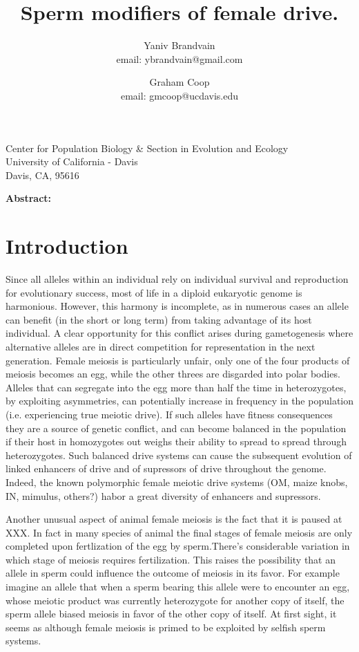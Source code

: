 \documentclass[12pt,letterpaper]{article}
\title{Sperm modifiers of female drive.}
\author{Yaniv Brandvain \\ email: ybrandvain@gmail.com  \and Graham Coop \\ email: gmcoop@ucdavis.edu }
\date{}
\begin{document}
\maketitle
\begin{center}
Center for Population Biology \& Section in Evolution and Ecology \\ University of California - Davis \\ Davis, CA, 95616
\end{center}

{\bf Abstract:}
\newpage

\section*{Introduction}

Since all alleles within an individual rely on individual survival and reproduction for evolutionary success, most of life in a diploid eukaryotic genome is harmonious.
However, this harmony is incomplete, as in numerous cases an allele can benefit (in the short or long term) from taking advantage of its host individual.
A clear opportunity for this conflict arises during gametogenesis where alternative alleles are in direct competition for representation in the next generation.
Female meiosis is particularly unfair, only one of the four products of meiosis becomes an egg, while the other threes
are disgarded into polar bodies. 
Alleles that can segregate into the egg more than half the time in heterozygotes, by exploiting asymmetries, 
can potentially increase in frequency in the population (i.e. experiencing true meiotic drive).
If such alleles have fitness consequences they are a source of genetic conflict, 
and can become balanced in the population if their host in homozygotes 
out weighs their ability to spread to spread through heterozygotes. 
Such balanced drive systems can cause the subsequent evolution of linked enhancers of drive
and of supressors of drive throughout the genome. 
Indeed, the known polymorphic female meiotic drive systems (OM, maize knobs, IN, mimulus, others?) habor
a great diversity of enhancers and supressors. 

Another unusual aspect of animal female meiosis is the fact that it is paused at XXX.
In fact in many species of animal the final stages of female meiosis are only completed upon fertlization of the egg by sperm.There's considerable variation in 
which stage of meiosis requires fertilization.
This raises the possibility that an allele in sperm could influence the outcome of meiosis in its favor. 
For example imagine an allele that when a sperm bearing this allele were to encounter an egg, whose meiotic product was currently heterozygote for 
another copy of itself, the sperm allele biased meiosis in favor of the other copy of itself.
At first sight, it seems as although female meiosis is primed to be exploited by selfish sperm systems. 
\end{document}

